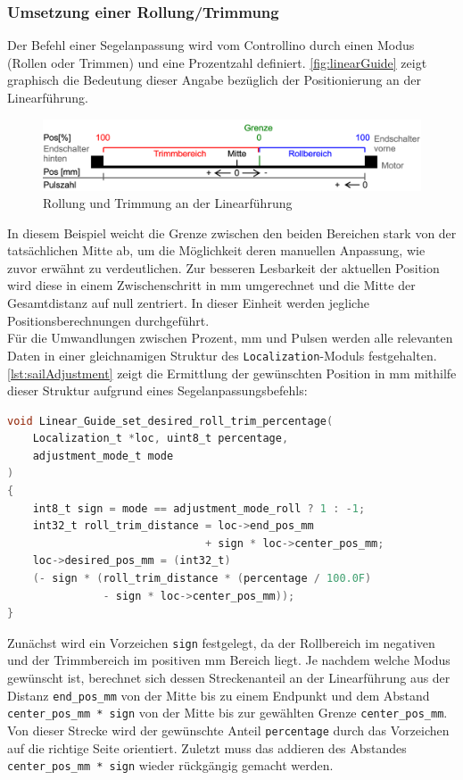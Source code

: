 \subsubsection{Umsetzung einer Rollung/Trimmung}
Der Befehl einer Segelanpassung wird vom Controllino durch einen Modus (Rollen oder Trimmen) und eine Prozentzahl definiert. \autoref{fig:linearGuide} zeigt graphisch die Bedeutung dieser Angabe bezüglich der Positionierung an der Linearführung.
\begin{figure}[H]
	\centering
	\includegraphics[width=\linewidth]{images/Software/LinearGuide.png}
	\caption{Rollung und Trimmung an der Linearführung}
	\label{fig:linearGuide}
\end{figure}
\noindent
In diesem Beispiel weicht die Grenze zwischen den beiden Bereichen stark von der tatsächlichen Mitte ab, um die Möglichkeit deren manuellen Anpassung, wie zuvor erwähnt zu verdeutlichen. Zur besseren Lesbarkeit der aktuellen Position wird diese in einem Zwischenschritt in mm umgerechnet und die Mitte der Gesamtdistanz auf null zentriert. In dieser Einheit werden jegliche Positionsberechnungen durchgeführt. \\

\noindent
Für die Umwandlungen zwischen Prozent, mm und Pulsen werden alle relevanten Daten in einer gleichnamigen Struktur des \verb|Localization|-Moduls festgehalten. \autoref{lst:sailAdjustment} zeigt die Ermittlung der gewünschten Position in mm mithilfe dieser Struktur aufgrund eines Segelanpassungsbefehls:
\begin{lstlisting}[language=C, caption={Berechnung der Zielposition}, label={lst:sailAdjustment}]
void Linear_Guide_set_desired_roll_trim_percentage(
	Localization_t *loc, uint8_t percentage, 
	adjustment_mode_t mode
)
{
	int8_t sign = mode == adjustment_mode_roll ? 1 : -1;
	int32_t roll_trim_distance = loc->end_pos_mm
	                           + sign * loc->center_pos_mm;
	loc->desired_pos_mm = (int32_t) 
	(- sign * (roll_trim_distance * (percentage / 100.0F)
	           - sign * loc->center_pos_mm));
}
\end{lstlisting}
Zunächst wird ein Vorzeichen \verb|sign| festgelegt, da der Rollbereich im negativen und der Trimmbereich im positiven mm Bereich liegt. Je nachdem welche Modus gewünscht ist, berechnet sich dessen Streckenanteil an der Linearführung aus der Distanz \verb|end_pos_mm| von der Mitte bis zu einem Endpunkt und dem Abstand \verb|center_pos_mm * sign| von der Mitte bis zur gewählten Grenze \verb|center_pos_mm|. Von dieser Strecke wird der gewünschte Anteil \verb|percentage| durch das Vorzeichen auf die richtige Seite orientiert. Zuletzt muss das addieren des Abstandes \verb|center_pos_mm * sign| wieder rückgängig gemacht werden.\\

